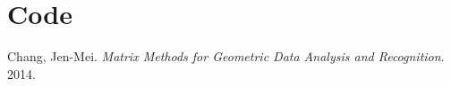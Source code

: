 \newpage

\appendix

\section{Code}\label{code}

%


\begin{thebibliography}{10}
    Chang, Jen-Mei. \textit{Matrix Methods for Geometric Data Analysis and Recognition}. 2014.

\end{thebibliography}


